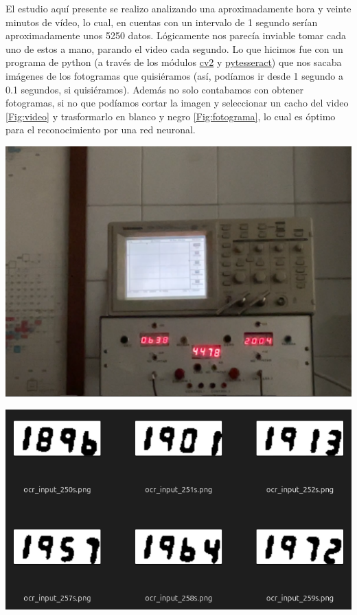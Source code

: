 \documentclass[11pt]{article}
\begin{document}
El estudio aquí presente se realizo analizando una aproximadamente hora y veinte minutos de vídeo, lo cual, en cuentas con un intervalo de 1 segundo serían aproximadamente unos 5250 datos. Lógicamente nos parecía inviable tomar cada uno de estos a mano, parando el video cada segundo. Lo que hicimos fue con un programa de python (a través de los módulos \href{https://pypi.org/project/opencv-python/}{cv2} y \href{https://pypi.org/project/pytesseract/}{pytesseract}) que nos sacaba imágenes de los fotogramas que quisiéramos (así, podíamos ir desde 1 segundo a 0.1 segundos, si quisiéramos). Además no solo contabamos con obtener fotogramas, si no que podíamos cortar la imagen y seleccionar un cacho del video \cref{Fig:video} y trasformarlo en blanco y negro \cref{Fig:fotograma}, lo cual es óptimo para el reconocimiento por una red neuronal.

\begin{minipage}[t]{0.45\linewidth}
	\begin{center}
	\label{Fig:video}
	\includegraphics[width=0.75\linewidth]{../Imagenes/VideoOriginal.png}
	\end{center}
\end{minipage}	
\hfill
\begin{minipage}[t]{0.5\linewidth}
\begin{center}
	\label{Fig:fotograma}
	\includegraphics[width=0.88\linewidth]{../Imagenes/Fotogramas.png}
\end{center}
\end{minipage}	
\end{document}

